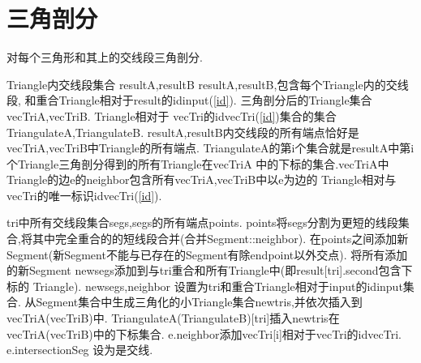 \documentclass[a4paper]{book}
\renewcommand{\algorithmicrequire}{\textbf{输入:}}
\renewcommand{\algorithmicensure}{\textbf{输出:}}
\renewcommand{\algorithmicrequire}{\textbf{Input : }}
\renewcommand{\algorithmicrequire}{\textbf{Precondition : }}
\renewcommand{\algorithmicensure}{\textbf{Output : }}
\renewcommand{\algorithmicensure}{\textbf{Postcondition : }}
\numberwithin{equation}{chapter}
\theoremstyle{definition}
\begin{document}
\section{三角剖分}
\begin{algorithm}\label{Triangulation}
	\caption{对每个三角形和其上的交线段三角剖分.}
	\begin{algorithmic}[1]
		\renewcommand{\algorithmicrequire}{\textbf{Input : }}
		\Require Triangle内交线段集合 resultA,resultB
		\renewcommand{\algorithmicrequire}{\textbf{Precondition : }}
		\Require resultA,resultB,包含每个Triangle内的交线段,
        和重合Triangle相对于result的idinput(\ref{id}).
		\renewcommand{\algorithmicensure}{\textbf{Output : }}
        \Ensure  三角剖分后的Triangle集合 vecTriA,vecTriB. Triangle相对于
        vecTri的idvecTri(\ref{id})集合的集合 TriangulateA,TriangulateB.
		\renewcommand{\algorithmicensure}{\textbf{Postcondition : }}
		\Ensure resultA,resultB内交线段的所有端点恰好是vecTriA,vecTriB中Triangle的所有端点.
        TriangulateA的第i个集合就是resultA中第i个Triangle三角剖分得到的所有Triangle在vecTriA
        中的下标的集合.vecTriA中Triangle的边e的neighbor包含所有vecTriA,vecTriB中以e为边的
        Triangle相对与vecTri的唯一标识idvecTri(\ref{id}).

        \State tri中所有交线段集合segs,segs的所有端点points.
        \State points将segs分割为更短的线段集合,将其中完全重合的的短线段合并(合并Segment::neighbor).
        \State 在points之间添加新Segment(新Segment不能与已存在的Segment有除endpoint以外交点).
\State 将所有添加的新Segment newsegs添加到与tri重合和所有Triangle中(即result[tri].second包含下标的
Triangle).
        \State newsegs,neighbor 设置为tri和重合Triangle相对于input的idinput集合.
        \State 从Segment集合中生成三角化的小Triangle集合newtris,并依次插入到vecTriA(vecTriB)中.
        \State TriangulateA(TriangulateB)[tri]插入newtris在vecTriA(vecTriB)中的下标集合.
        \EndFor
        \State e.neighbor添加vecTri[i]相对于vecTri的idvecTri.
        \State e.intersectionSeg 设为是交线.
        \EndIf
        \EndIf
        \EndFor
        \EndFor
        \EndFor
        \EndFor
		\EndFunction
	\end{algorithmic}
\end{algorithm}
\end{document}
